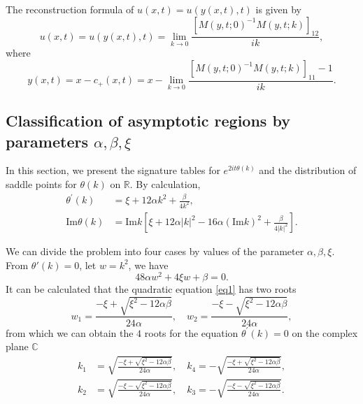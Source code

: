\documentclass[11pt]{article}
\numberwithin{equation}{section}
\begin{document}
The reconstruction formula of  $u(x,t)=u(y(x,t),t)$ is given by
\begin{equation}
u(x,t)=u(y(x,t),t)=\lim_{k\to0}\frac{\left[M(y,t;0)^{-1}M(y,t;k)\right]_{12}}{ik},
\end{equation}
where
\begin{equation}
    y(x,t)=x-c_+(x,t)=x-\lim_{k\to0}\frac{\left[M(y,t;0)^{-1}M(y,t;k)\right]_{11}-1}{ik}.
\end{equation}
\subsection{\texorpdfstring{Classification of asymptotic regions by parameters $\alpha,\beta,\xi$}{Classification of asymptotic regions by parameters alpha, beta, xi}}\label{subs2.4}
In this section, we present the signature tables for $e^{2it\theta(k)}$ and the distribution of saddle points for $\theta(k) $ on $\mathbb{R}$. By calculation,
\begin{align}
    \theta^{'}(k)&=\xi+12\alpha k^2+\frac{\beta}{4k^2},\nonumber\\ \mathrm{Im}\theta(k)&=\mathrm{Im}k\left[\xi+12\alpha|k|^2-16\alpha (\mathrm{Im}k)^2+\frac{\beta}{4|k|^2} \right].\label{Imthata}
\end{align}

We can divide the problem into four cases by values of the parameter $\alpha,\beta,\xi$. From $\theta'(k)=0$, let $w=k^2$, we have
    \begin{equation}
        48\alpha w^2+4\xi w+\beta=0.\label{eq1}
    \end{equation}
    It can be calculated that the quadratic equation \eqref{eq1} has two roots
    \begin{equation*}
        w_1=\frac{-\xi+\sqrt{\xi^2-12\alpha\beta}}{24\alpha},\quad w_2=\frac{-\xi-\sqrt{\xi^2-12\alpha\beta}}{24\alpha},
    \end{equation*}
    from which we can obtain the $4$ roots for the equation $ \theta^{'}(k)=0$ on the complex plane $\mathbb{C}$
    \begin{equation}\label{eq42}
    \begin{aligned}
         k_1&=\sqrt{\frac{-\xi+\sqrt{\xi^2-12\alpha\beta}}{24\alpha}},\quad k_4=-\sqrt{\frac{-\xi+\sqrt{\xi^2-12\alpha\beta}}{24\alpha}},\\
         k_2&=\sqrt{\frac{-\xi-\sqrt{\xi^2-12\alpha\beta}}{24\alpha}},\quad k_3=-\sqrt{\frac{-\xi-\sqrt{\xi^2-12\alpha\beta}}{24\alpha}}.
    \end{aligned}
    \end{equation}
\end{document}
